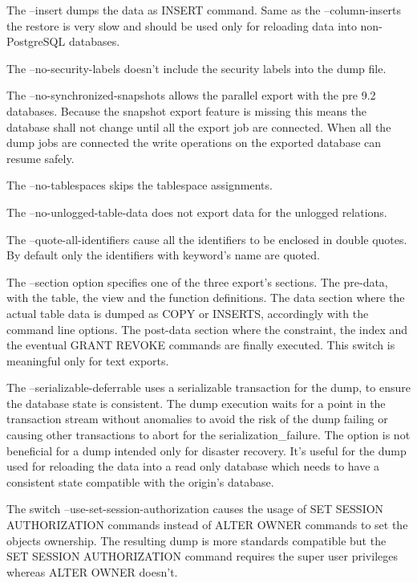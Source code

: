 The --insert dumps the data as INSERT command. Same as the --column-inserts the restore is very 
slow and should be used only for reloading data into non-PostgreSQL databases.\newline

The --no-security-labels doesn't include the security labels into the dump file.\newline

The --no-synchronized-snapshots  allows the parallel export with the pre 9.2 databases. Because
the snapshot export feature is missing this means the database shall not change until all the export
job are connected. When all the dump jobs are connected the write operations on the
exported database can resume safely.\newline

The --no-tablespaces skips the tablespace assignments.\newline

The --no-unlogged-table-data does not export data for the unlogged relations.\newline

The --quote-all-identifiers  cause all the identifiers to be enclosed in double quotes. By default 
only the identifiers with keyword's name are quoted.\newline

The --section option specifies one of the three export's sections. The pre-data, with the 
table, the view and the function definitions. The data section where the actual table data is 
dumped as COPY or INSERTS, accordingly with the command line options. The post-data section 
where the constraint, the index and the eventual GRANT REVOKE commands are finally executed. This 
switch is meaningful only for text exports. \newline

The --serializable-deferrable uses a serializable transaction for the dump, to ensure the database 
state is consistent. The dump execution waits for a point in the transaction stream without 
anomalies to avoid the risk of the dump failing or causing other transactions to abort for the 
serialization\_failure. The option is not beneficial for a dump intended only for disaster 
recovery. It's useful for the dump used for reloading the data into a read only database which 
needs to have a consistent state compatible with the origin's database.\newline

The switch --use-set-session-authorization causes the usage of SET SESSION AUTHORIZATION 
commands instead of ALTER OWNER commands to set the objects ownership. The resulting dump is more 
standards compatible but the SET SESSION AUTHORIZATION command requires the super user privileges 
whereas ALTER OWNER doesn't.


